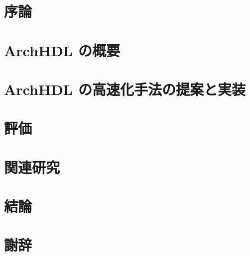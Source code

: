 \begin{abstract}
 
\end{abstract}

\maketitle

\section{序論}



\section{ArchHDL の概要} \label{s:summary}



\section{ArchHDL の高速化手法の提案と実装} \label{s:method}



\section{評価} \label{s:evaluation}



\section{関連研究} \label{s:relatedwork}



\section{結論} \label{s:conclusion}



\section{謝辞} \label{s:acknowledgment}


